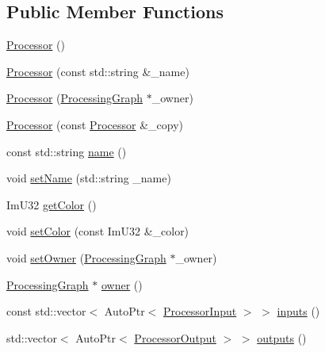 \subsection*{Public Member Functions}
\begin{DoxyCompactItemize}
\item 
\mbox{\hyperlink{class_chill_1_1_processor_ae4f5d1338dcae8154ea8339cb2524fd1}{Processor}} ()
\item 
\mbox{\hyperlink{class_chill_1_1_processor_ac8ef42b4ab4e0c32265743691d4bb272}{Processor}} (const std\+::string \&\+\_\+name)
\item 
\mbox{\hyperlink{class_chill_1_1_processor_aed80279651d92dd2d3077120ba2c8491}{Processor}} (\mbox{\hyperlink{class_chill_1_1_processing_graph}{Processing\+Graph}} $\ast$\+\_\+owner)
\item 
\mbox{\hyperlink{class_chill_1_1_processor_a36d7f0ccee9cfa13fbe58cee33619521}{Processor}} (const \mbox{\hyperlink{class_chill_1_1_processor}{Processor}} \&\+\_\+copy)
\item 
const std\+::string \mbox{\hyperlink{class_chill_1_1_processor_a8d35027206ef53bd40d2554f2f4b9046}{name}} ()
\item 
void \mbox{\hyperlink{class_chill_1_1_processor_a1daa8b6fe879d65d96ca507a64a2adf0}{set\+Name}} (std\+::string \+\_\+name)
\item 
Im\+U32 \mbox{\hyperlink{class_chill_1_1_processor_a4ee8538c5b95c44cd04224efd86f94bf}{get\+Color}} ()
\item 
void \mbox{\hyperlink{class_chill_1_1_processor_ae0835b5fa85f9038911a72b2c293b7b3}{set\+Color}} (const Im\+U32 \&\+\_\+color)
\item 
void \mbox{\hyperlink{class_chill_1_1_processor_a295fa343c9c834d8c29f057aa0754d30}{set\+Owner}} (\mbox{\hyperlink{class_chill_1_1_processing_graph}{Processing\+Graph}} $\ast$\+\_\+owner)
\item 
\mbox{\hyperlink{class_chill_1_1_processing_graph}{Processing\+Graph}} $\ast$ \mbox{\hyperlink{class_chill_1_1_processor_a3024af1d7f7785b03485a79eece5be3b}{owner}} ()
\item 
const std\+::vector$<$ Auto\+Ptr$<$ \mbox{\hyperlink{class_chill_1_1_processor_input}{Processor\+Input}} $>$ $>$ \mbox{\hyperlink{class_chill_1_1_processor_ae31251f77eaca1c86fb326cac6833695}{inputs}} ()
\item 
std\+::vector$<$ Auto\+Ptr$<$ \mbox{\hyperlink{class_chill_1_1_processor_output}{Processor\+Output}} $>$ $>$ \mbox{\hyperlink{class_chill_1_1_processor_a5ed85c9d070167d489eb51022863887a}{outputs}} ()

\end{DoxyCompactItemize}
